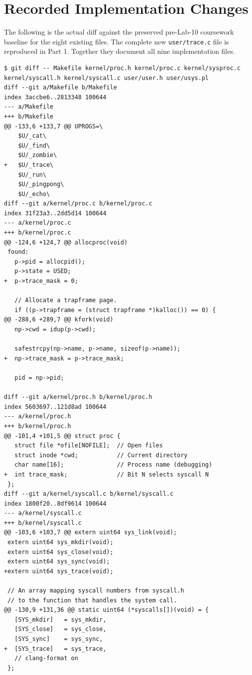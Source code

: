 \documentclass[12pt,a4paper]{article}
\begin{document}
\appendix
\section{Recorded Implementation Changes}
The following is the actual diff against the preserved pre-Lab-10 coursework
baseline for the eight existing files. The complete new \texttt{user/trace.c}
file is reproduced in Part 1. Together they document all nine implementation files.

\begin{lstlisting}[caption={Actual changes to existing xv6 files}]
$ git diff -- Makefile kernel/proc.h kernel/proc.c kernel/sysproc.c kernel/syscall.h kernel/syscall.c user/user.h user/usys.pl
diff --git a/Makefile b/Makefile
index 3accbe6..2813348 100644
--- a/Makefile
+++ b/Makefile
@@ -133,6 +133,7 @@ UPROGS=\
 	$U/_cat\
 	$U/_find\
 	$U/_zombie\
+	$U/_trace\
 	$U/_run\
 	$U/_pingpong\
 	$U/_echo\
diff --git a/kernel/proc.c b/kernel/proc.c
index 31f23a3..2dd5d14 100644
--- a/kernel/proc.c
+++ b/kernel/proc.c
@@ -124,6 +124,7 @@ allocproc(void)
 found:
   p->pid = allocpid();
   p->state = USED;
+  p->trace_mask = 0;
 
   // Allocate a trapframe page.
   if ((p->trapframe = (struct trapframe *)kalloc()) == 0) {
@@ -288,6 +289,7 @@ kfork(void)
   np->cwd = idup(p->cwd);
 
   safestrcpy(np->name, p->name, sizeof(p->name));
+  np->trace_mask = p->trace_mask;
 
   pid = np->pid;
 
diff --git a/kernel/proc.h b/kernel/proc.h
index 5603697..121d8ad 100644
--- a/kernel/proc.h
+++ b/kernel/proc.h
@@ -101,4 +101,5 @@ struct proc {
   struct file *ofile[NOFILE];  // Open files
   struct inode *cwd;           // Current directory
   char name[16];               // Process name (debugging)
+  int trace_mask;              // Bit N selects syscall N
 };
diff --git a/kernel/syscall.c b/kernel/syscall.c
index 1800f20..8df9614 100644
--- a/kernel/syscall.c
+++ b/kernel/syscall.c
@@ -103,6 +103,7 @@ extern uint64 sys_link(void);
 extern uint64 sys_mkdir(void);
 extern uint64 sys_close(void);
 extern uint64 sys_sync(void);
+extern uint64 sys_trace(void);
 
 // An array mapping syscall numbers from syscall.h
 // to the function that handles the system call.
@@ -130,9 +131,36 @@ static uint64 (*syscalls[])(void) = {
   [SYS_mkdir]   = sys_mkdir,
   [SYS_close]   = sys_close,
   [SYS_sync]    = sys_sync,
+  [SYS_trace]   = sys_trace,
   // clang-format on
 };
 

\end{lstlisting}
\end{document}
